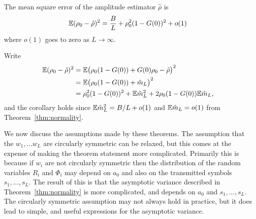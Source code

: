 \documentclass[conference]{IEEEtran}
\begin{document}
\begin{corollary}\label{cor:ampmse}
The mean square error of the amplitude estimator $\hat{\rho}$ is 
\[
{\mathbb E} (\rho_0 - \hat{\rho})^2 = \frac{B}{L} + \rho_0^2(1 - G(0))^2 + o(1)
\] 
where $o(1)$ goes to zero as $L \rightarrow \infty$.
\end{corollary}
\begin{IEEEproof} Write
\begin{align*}
{\mathbb E} (\rho_0 - \hat{\rho})^2 &= {\mathbb E} \big( \rho_0(1 - G(0)) + G(0)\rho_0 - \hat{\rho} \big)^2 \\
&= {\mathbb E} \big( \rho_0(1 - G(0)) + \hat{m}_L \big)^2 \\
&= \rho_0^2(1 - G(0))^2 + {\mathbb E} \hat{m}_L^2 + 2\rho_0(1 - G(0)){\mathbb E}\hat{m}_L,
\end{align*}
and the corollary holds since ${\mathbb E} \hat{m}_L^2 = B/L + o(1)$ and ${\mathbb E}\hat{m}_L = o(1)$ from Theorem~\ref{thm:normality}.
\end{IEEEproof}



We now discuss the assumptions made by these theorems.  The assumption that the $w_1, \dots w_L$ are circularly symmetric can be relaxed, but this comes at the expense of making the theorem statement more complicated.  Primarily this is because if $w_i$ are not circularly symmetric then the distribution of the random variables $R_i$ and $\Phi_i$ may depend on $a_0$ and also on the transmitted symbols $s_1, \dots, s_L$.  The result of this is that the asymptotic variance described in Theorem~\ref{thm:normality} is more complicated, and depends on $a_0$ and $s_1, \dots, s_L$.  The circularly symmetric assumption may not always hold in practice, but it does lead to simple, and useful expressions for the asymptotic variance.
\end{document}
